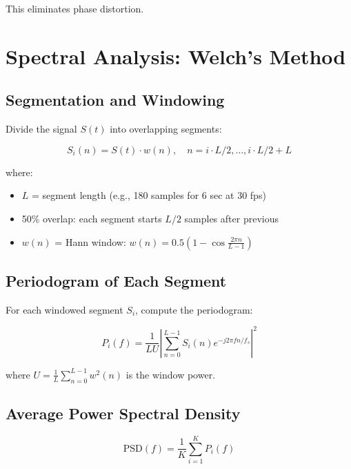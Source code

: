 \documentclass[11pt,a4paper]{article}
\begin{document}
This eliminates phase distortion.

\section{Spectral Analysis: Welch's Method}

\subsection{Segmentation and Windowing}

Divide the signal $S(t)$ into overlapping segments:

\begin{equation}
S_i(n) = S(t) \cdot w(n), \quad n = i \cdot L/2, \ldots, i \cdot L/2 + L
\end{equation}

where:
\begin{itemize}
    \item $L$ = segment length (e.g., 180 samples for 6 sec at 30 fps)
    \item 50\% overlap: each segment starts $L/2$ samples after previous
    \item $w(n)$ = Hann window: $w(n) = 0.5 \left(1 - \cos\frac{2\pi n}{L-1}\right)$
\end{itemize}

\subsection{Periodogram of Each Segment}

For each windowed segment $S_i$, compute the periodogram:

\begin{equation}
P_i(f) = \frac{1}{LU} \left| \sum_{n=0}^{L-1} S_i(n) e^{-j 2\pi f n / f_s} \right|^2
\end{equation}

where $U = \frac{1}{L} \sum_{n=0}^{L-1} w^2(n)$ is the window power.

\subsection{Average Power Spectral Density}

\begin{equation}
\text{PSD}(f) = \frac{1}{K} \sum_{i=1}^{K} P_i(f)
\end{equation}
\end{document}
